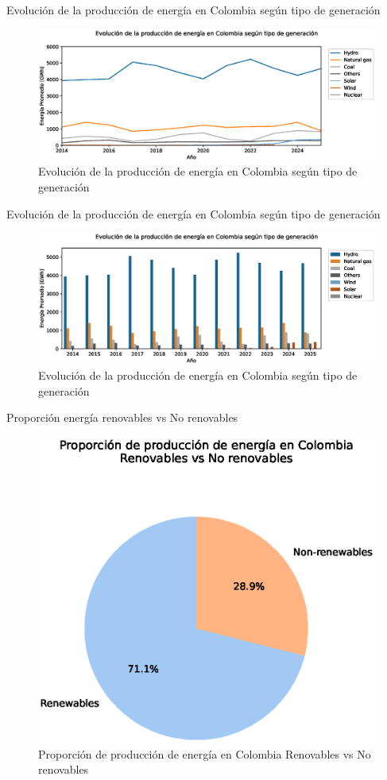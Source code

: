 \documentclass[10pt]{beamer}
\begin{document}
\begin{frame}[fragile]{Evolución de la producción de energía en Colombia según tipo de generación}
\begin{figure}[t]
	\centering
	\includegraphics[width=0.9\linewidth]{../../reports/fig_8}
	\caption{Evolución de la producción de energía en Colombia según tipo de generación}
	\label{fig:fig8}
\end{figure}	
\end{frame}
	
	
\begin{frame}[fragile]{Evolución de la producción de energía en Colombia según tipo de generación}
\begin{figure}[t]
	\centering
	\includegraphics[width=0.9\linewidth]{../../reports/fig_9}
	\caption{Evolución de la producción de energía en Colombia según tipo de generación}
	\label{fig:fig9}
\end{figure}	
	\end{frame}
	
		\begin{frame}[fragile]{Proporción energía renovables vs No renovables}
\begin{figure}[t]
	\centering
	\includegraphics[width=0.6\linewidth]{../../reports/fig_10}
	\caption{Proporción de producción de energía en Colombia Renovables vs No renovables}
	\label{fig:fig10}
\end{figure}	
\end{frame}
	
\end{document}
